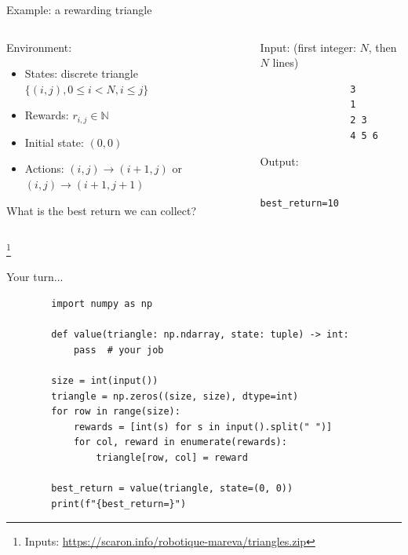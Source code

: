 \documentclass[11pt, aspectratio=169]{beamer}
\newcommand\blfootnote[1]{%
  \begingroup
  \renewcommand\thefootnote{}%
  \footnote{#1}%
  \addtocounter{footnote}{-1}%
  \endgroup
}
\begin{document}
\begin{frame}[fragile]{Example: a rewarding triangle}
    \begin{columns}
        \begin{column}{0.50\columnwidth}
            Environment:
            \begin{itemize}
                \item States: discrete triangle $\{(i, j), 0 \leq i < N, i \leq j \}$
                \item Rewards: $r_{i, j} \in \mathbb{N}$
                \item Initial state: $(0, 0)$
                \item Actions: $(i, j) \to (i + 1, j)$ or $(i, j) \to (i + 1, j + 1)$
            \end{itemize}
            What is the best return we can collect?
        \end{column}
        \begin{column}{0.50\columnwidth}
            Input: (first integer: $N$, then $N$ lines)
            \begin{verbatim}
                3
                1
                2 3
                4 5 6
            \end{verbatim}
            Output:
            \begin{verbatim}
                best_return=10
            \end{verbatim}
        \end{column}
    \end{columns}
    \blfootnote{
        Inputs: \url{https://scaron.info/robotique-mareva/triangles.zip}
    }
\end{frame}

\begin{frame}[fragile]{Your turn...}
    \begin{verbatim}
        import numpy as np

        def value(triangle: np.ndarray, state: tuple) -> int:
            pass  # your job

        size = int(input())
        triangle = np.zeros((size, size), dtype=int)
        for row in range(size):
            rewards = [int(s) for s in input().split(" ")]
            for col, reward in enumerate(rewards):
                triangle[row, col] = reward

        best_return = value(triangle, state=(0, 0))
        print(f"{best_return=}")
    \end{verbatim}
\end{frame}
\end{document}
